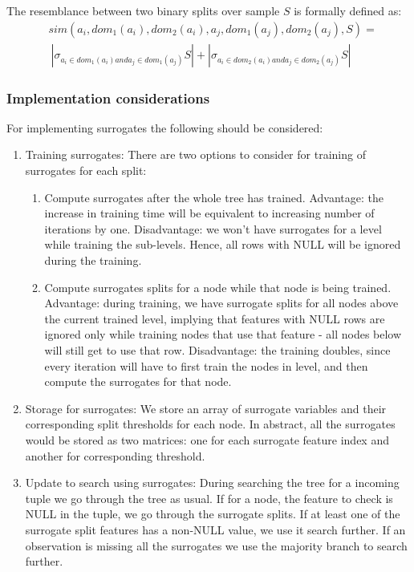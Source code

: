 The resemblance between two binary splits over sample $S$ is formally defined as:
\begin{align*}
    & sim(a_i, dom_1(a_i), dom_2(a_i), a_j, dom_1(a_j), dom_2(a_j), S) = \\
     & \ |\sigma_{a_i \in dom_1(a_i) and a_j \in dom_1(a_j)} S| +
                |\sigma_{a_i \in dom_2(a_i) and a_j \in dom_2(a_j)} S|
\end{align*}

\subsubsection{Implementation considerations} %
\label{ssub:surrogates_impl}
For implementing surrogates the following should be considered:

\begin{enumerate}
    \item Training surrogates: There are two options to consider for training
    of surrogates for each split:
    \begin{enumerate}
        \item Compute surrogates after the whole tree has trained. Advantage:
        the increase in training time will be equivalent to increasing number of
        iterations by one. Disadvantage: we won't have surrogates
        for a level while training the sub-levels. Hence, all rows with NULL will
        be ignored during the training.
        \item Compute surrogates splits for a node while that node is being trained.
        Advantage: during training, we have surrogate splits for all nodes above
        the current trained level, implying that features with NULL rows are
        ignored only while training nodes that use that feature - all nodes below
        will still get to use that row. Disadvantage: the training doubles, since
        every iteration will have to first train the nodes in level, and then
        compute the surrogates for that node.
    \end{enumerate}
    \item Storage for surrogates: We store an array of surrogate variables and
        their corresponding split thresholds for each node. In abstract, all the
        surrogates would be stored as two matrices: one for each surrogate feature
        index and another for corresponding threshold.
    \item Update to search using surrogates: During searching the tree for a
        incoming tuple we go through the tree as usual. If for a node, the feature
        to check is NULL in the tuple, we go through the surrogate splits. If
        at least one of the surrogate split features has a non-NULL value, we
        use it search further. If an observation is missing all the surrogates
        we use the majority branch to search further.


\end{enumerate}
